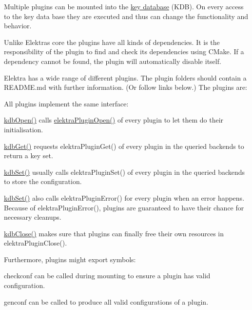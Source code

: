 Multiple plugins can be mounted into the \hyperlink{doc_help_elektra-glossary_md}{key database} (K\+DB). On every access to the key data base they are executed and thus can change the functionality and behavior.

Unlike Elektra\textquotesingle{}s core the plugins have all kinds of dependencies. It is the responsibility of the plugin to find and check its dependencies using C\+Make. If a dependency cannot be found, the plugin will automatically disable itself.

Elektra has a wide range of different plugins. The plugin folders should contain a R\+E\+A\+D\+M\+E.\+md with further information. (Or follow links below.) The plugins are\+:

 

All plugins implement the same interface\+:


\begin{DoxyItemize}
\item {\ttfamily \hyperlink{group__kdb_ga844e1299a84c3fbf1d3a905c5c893ba5}{kdb\+Open()}} calls {\ttfamily \hyperlink{elektra_2plugin_8c_a32a70a7876542c51d153164ac5108a57}{elektra\+Plugin\+Open()}} of every plugin to let them do their initialisation.
\item {\ttfamily \hyperlink{group__kdb_ga28e385fd9cb7ccfe0b2f1ed2f62453a1}{kdb\+Get()}} requests {\ttfamily elektra\+Plugin\+Get()} of every plugin in the queried backends to return a key set.
\item {\ttfamily \hyperlink{group__kdb_ga11436b058408f83d303ca5e996832bcf}{kdb\+Set()}} usually calls {\ttfamily elektra\+Plugin\+Set()} of every plugin in the queried backends to store the configuration.
\item {\ttfamily \hyperlink{group__kdb_ga11436b058408f83d303ca5e996832bcf}{kdb\+Set()}} also calls {\ttfamily elektra\+Plugin\+Error()} for every plugin when an error happens. Because of {\ttfamily elektra\+Plugin\+Error()}, plugins are guaranteed to have their chance for necessary cleanups.
\item {\ttfamily \hyperlink{group__kdb_gadb54dc9fda17ee07deb9444df745c96f}{kdb\+Close()}} makes sure that plugins can finally free their own resources in {\ttfamily elektra\+Plugin\+Close()}.
\end{DoxyItemize}

Furthermore, plugins might export symbols\+:


\begin{DoxyItemize}
\item {\ttfamily checkconf} can be called during mounting to ensure a plugin has valid configuration.
\item {\ttfamily genconf} can be called to produce all valid configurations of a plugin.
\end{DoxyItemize}


